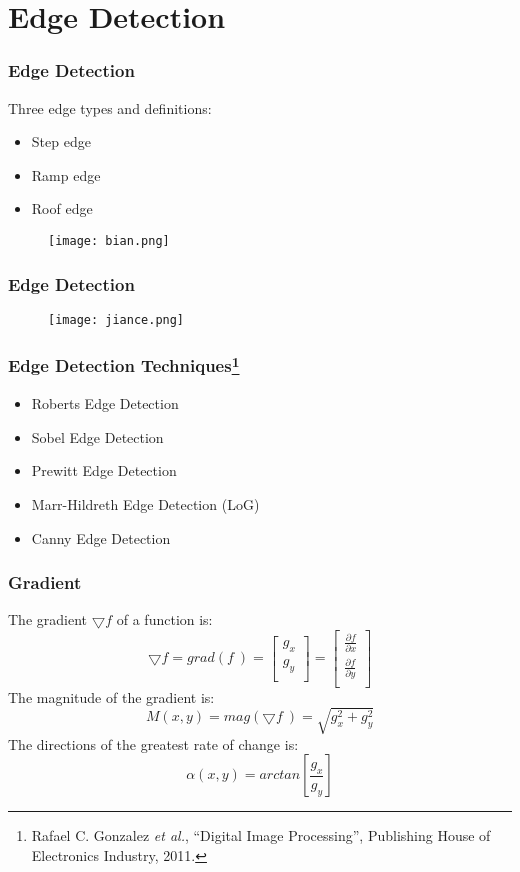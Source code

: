 \documentclass[notheorems,serif,table,compress]{beamer}  %
\begin{document}
\section{Edge Detection}
\begin{frame}
\frametitle{Edge Detection}
Three edge types and definitions:
\begin{itemize}
\item Step edge
\item Ramp edge
\item Roof edge
\end{itemize}
    \begin{figure}
    \texttt{[image: bian.png]} 
    \end{figure}
\end{frame}

\begin{frame}
\frametitle{Edge Detection}
    \begin{figure}
    \texttt{[image: jiance.png]} 
    \end{figure}
\end{frame}


\begin{frame}
\frametitle{Edge Detection Techniques\footnote{Rafael C. Gonzalez \textit{et al.}, ``Digital Image Processing'', Publishing House of Electronics Industry, 2011. }}
\begin{itemize}
\item Roberts Edge Detection
\item Sobel Edge Detection
\item Prewitt Edge Detection
\item Marr-Hildreth Edge Detection (LoG)
\item Canny Edge Detection
\end{itemize}
\end{frame}

\begin{frame}
\frametitle{Gradient}
The gradient $\bigtriangledown f$ of a function is: 
    \begin{displaymath}
    \bigtriangledown f = grad(f ~) = \left[\begin{array}{c}
		          g_{x}  \\
		          g_{y}  \\
		         \end{array}\right]
    =\left[ \begin{array}{c}
		          \frac{\partial f}{\partial x}  \\
		          \frac{\partial f}{\partial y}  \\
		         \end{array} \right]
    \end{displaymath}
    The magnitude of the gradient is:
    \begin{displaymath}
    M(x,y)=mag(\bigtriangledown f ~) = \sqrt{g_{x}^{2}+g_{y}^{2}}
    \end{displaymath}
The directions of the greatest rate of change is:
    \begin{displaymath}
    \alpha (x,y)=arctan \left[ \frac{g_{x}}{g_{y}} \right]
    \end{displaymath}
\end{frame}
\end{document}
